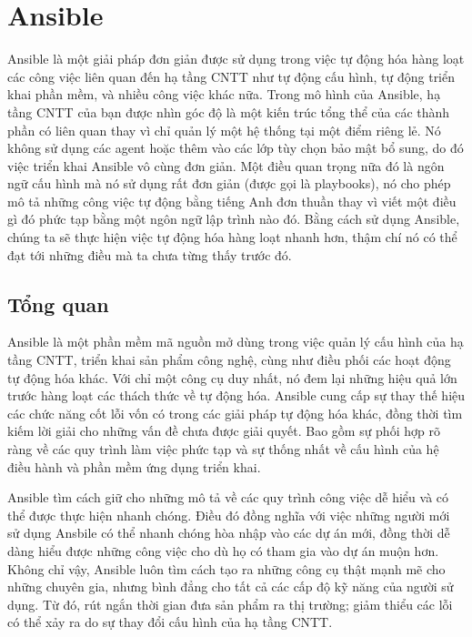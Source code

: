 \section{Ansible}
Ansible là một giải pháp đơn giản được sử dụng trong việc tự động hóa hàng loạt các công việc liên quan đến hạ tầng CNTT như tự động cấu hình, tự động triển khai phần mềm, và nhiều công việc khác nữa. Trong mô hình của Ansible, hạ tầng CNTT của bạn được nhìn góc độ là một kiến trúc tổng thể của các thành phần có liên quan thay vì chỉ quản lý một hệ thống tại một điểm riêng lẻ. Nó không sử dụng các agent hoặc thêm vào các lớp tùy chọn bảo mật bổ sung, do đó việc triển khai Ansible vô cùng đơn giản. Một điều quan trọng nữa đó là ngôn ngữ cấu hình mà nó sử dụng rất đơn giản (được gọi là playbooks), nó cho phép mô tả những công việc tự động bằng tiếng Anh đơn thuần thay vì viết một điều gì đó phức tạp bằng một ngôn ngữ lập trình nào đó. Bằng cách sử dụng Ansible, chúng ta sẽ thực hiện việc tự động hóa hàng loạt nhanh hơn, thậm chí nó có thể đạt tới những điều mà ta chưa từng thấy trước đó.

\subsection{Tổng quan}

Ansible là một phần mềm mã nguồn mở dùng trong việc quản lý cấu hình của hạ tầng CNTT, triển khai sản phẩm công nghệ, cùng như điều phối các hoạt động tự động hóa khác. Với chỉ một công cụ duy nhất, nó đem lại những hiệu quả lớn trước hàng loạt các thách thức về tự động hóa. Ansible cung cấp sự thay thế hiệu các chức năng cốt lỗi vốn có trong các giải pháp tự động hóa khác, đồng thời tìm kiếm lời giải cho những vấn đề chưa được giải quyết. Bao gồm sự phối hợp rõ ràng về các quy trình làm việc phức tạp và sự thống nhất về cấu hình của hệ điều hành và phần mềm ứng dụng triển khai.

Ansible tìm cách giữ cho những mô tả về các quy trình công việc dễ hiểu và có thể được thực hiện nhanh chóng. Điều đó đồng nghĩa với việc những người mới sử dụng Ansbile có thể nhanh chóng hòa nhập vào các dự án mới, đồng thời dễ dàng hiểu được những công việc cho dù họ có tham gia vào dự án muộn hơn. Không chỉ vậy, Ansible luôn tìm cách tạo ra những công cụ thật mạnh mẽ cho những chuyên gia, nhưng bình đẳng cho tất cả các cấp độ kỹ năng của người sử dụng. Từ đó, rút ngắn thời gian đưa sản phẩm ra thị trường; giảm thiểu các lỗi có thể xảy ra do sự thay đổi cấu hình của hạ tầng CNTT.

